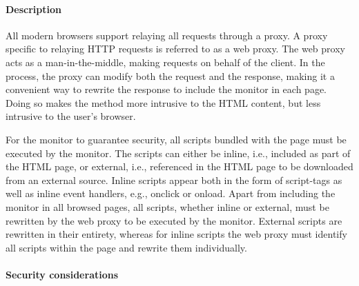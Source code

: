 \documentclass{llncs}
\newcommand{\todo}[1]{\colorbox{red}{\textcolor{white}{\sffamily\bfseries\scriptsize TODO}} \textcolor{red}{#1} \textcolor{red}{$\blacktriangleleft$}}
\begin{document}
\vspace{-.4cm}
\paragraph{Description}
All modern browsers support %
relaying all requests through a proxy.
A proxy specific to relaying HTTP requests is referred to as a web proxy.
The web proxy acts as a man-in-the-middle, making 
requests on behalf of the client. 
In the process, the proxy can
modify both the request and the response, making it 
a convenient way to rewrite the response to include 
the monitor in each page. Doing so makes the method more 
intrusive to the HTML content, but less intrusive to the user's browser. 

For the monitor to guarantee security, all scripts bundled with 
the page must be executed by the monitor. The scripts can either be inline, 
i.e., included as part of the HTML page, or external, i.e., referenced in the 
HTML page to be downloaded from an external source. Inline scripts appear both in the form of script-tags as well as inline event handlers, e.g., onclick or onload.
Apart from including the monitor in all browsed pages, all scripts, whether inline or 
external, must be rewritten by the web proxy to be executed by the monitor.
External scripts are rewritten in their entirety, whereas 
for inline scripts the web proxy must identify all scripts within the page and rewrite them individually.

\vspace{-.4cm}
\paragraph{Security considerations}
\end{document}
